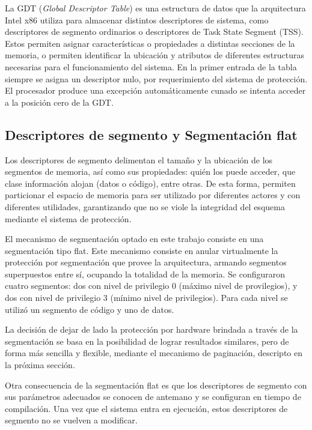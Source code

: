 	La GDT (\textit{Global Descriptor Table}) es una estructura de datos
que la arquitectura Intel x86 utiliza para almacenar distintos descriptores
de sistema, como descriptores de segmento ordinarios o descriptores de Task State 
Segment (TSS). Estos permiten asignar características o propiedades a distintas secciones de la memoria, 
o permiten identificar la ubicación y atributos de diferentes estructuras necesarias para el funcionamiento 
del sistema.
	En la primer entrada de la tabla siempre se asigna un descriptor nulo, por requerimiento del 
sistema de protección. El procesador produce una excepción automáticamente cunado se intenta acceder a la posición cero de la GDT.

\subsection{Descriptores de segmento y Segmentación flat}

	Los descriptores de segmento delimentan el tamaño y la ubicación de los segmentos de memoria, así como 
sus propiedades: quién los puede acceder, que clase información alojan (datos o código), entre otras. De esta forma, permiten particionar el espacio de memoria para ser utilizado por diferentes actores y con diferentes utilidades, garantizando que no se viole la integridad del esquema mediante el sistema de protección.

	El mecanismo de segmentación optado en este trabajo consiste en una segmentación tipo flat.
Este mecanismo consiste en anular virtualmente la protección por segmentación que provee la arquitectura, armando segmentos superpuestos entre sí, ocupando la totalidad de la memoria. Se configuraron cuatro segmentos: dos con nivel de privilegio 0 (máximo nivel de provilegios), y dos con nivel de privilegio
3 (mínimo nivel de privilegios). Para cada nivel se utilizó un segmento de código y uno
de datos.

	La decisión de dejar de lado la protección por hardware brindada a través de la segmentación se basa 
en la posibilidad de lograr resultados similares, pero de forma más sencilla y flexible, mediante el mecanismo de paginación, descripto en la próxima sección.

	Otra consecuencia de la segmentación flat es que los descriptores de segmento con sus parámetros 
adecuados se conocen de antemano y se configuran en tiempo de compilación. Una vez que el sistema 
entra en ejecución, estos descriptores de segmento no se vuelven a modificar.

